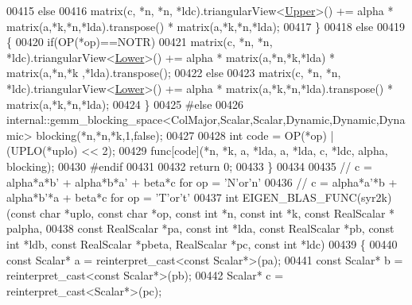 \begin{DoxyCode}
00415     \textcolor{keywordflow}{else}
00416       matrix(c, *n, *n, *ldc).triangularView<\hyperlink{group__enums_gga39e3366ff5554d731e7dc8bb642f83cda6bcb58be3b8b8ec84859ce0c5ac0aaec}{Upper}>() += alpha * matrix(a,*k,*n,*lda).transpose() * 
      matrix(a,*k,*n,*lda);
00417   \}
00418   \textcolor{keywordflow}{else}
00419   \{
00420     \textcolor{keywordflow}{if}(OP(*op)==NOTR)
00421       matrix(c, *n, *n, *ldc).triangularView<\hyperlink{group__enums_gga39e3366ff5554d731e7dc8bb642f83cda891792b8ed394f7607ab16dd716f60e6}{Lower}>() += alpha * matrix(a,*n,*k,*lda) * matrix(a,*n,*k
      ,*lda).transpose();
00422     \textcolor{keywordflow}{else}
00423       matrix(c, *n, *n, *ldc).triangularView<\hyperlink{group__enums_gga39e3366ff5554d731e7dc8bb642f83cda891792b8ed394f7607ab16dd716f60e6}{Lower}>() += alpha * matrix(a,*k,*n,*lda).transpose() * 
      matrix(a,*k,*n,*lda);
00424   \}
00425 \textcolor{preprocessor}{  #else}
00426   internal::gemm\_blocking\_space<ColMajor,Scalar,Scalar,Dynamic,Dynamic,Dynamic> blocking(*n,*n,*k,1,\textcolor{keyword}{false});
00427 
00428   \textcolor{keywordtype}{int} code = OP(*op) | (UPLO(*uplo) << 2);
00429   func[code](*n, *k, a, *lda, a, *lda, c, *ldc, alpha, blocking);
00430 \textcolor{preprocessor}{  #endif}
00431 
00432   \textcolor{keywordflow}{return} 0;
00433 \}
00434 
00435 \textcolor{comment}{// c = alpha*a*b' + alpha*b*a' + beta*c  for op = 'N'or'n'}
00436 \textcolor{comment}{// c = alpha*a'*b + alpha*b'*a + beta*c  for op = 'T'or't'}
00437 \textcolor{keywordtype}{int} EIGEN\_BLAS\_FUNC(syr2k)(\textcolor{keyword}{const} \textcolor{keywordtype}{char} *uplo, \textcolor{keyword}{const} \textcolor{keywordtype}{char} *op, \textcolor{keyword}{const} \textcolor{keywordtype}{int} *n, \textcolor{keyword}{const} \textcolor{keywordtype}{int} *k, \textcolor{keyword}{const} RealScalar *
      palpha,
00438                            \textcolor{keyword}{const} RealScalar *pa, \textcolor{keyword}{const} \textcolor{keywordtype}{int} *lda, \textcolor{keyword}{const} RealScalar *pb, \textcolor{keyword}{const} \textcolor{keywordtype}{int} *ldb, \textcolor{keyword}{
      const} RealScalar *pbeta, RealScalar *pc, \textcolor{keyword}{const} \textcolor{keywordtype}{int} *ldc)
00439 \{
00440   \textcolor{keyword}{const} Scalar* a = \textcolor{keyword}{reinterpret\_cast<}\textcolor{keyword}{const }Scalar*\textcolor{keyword}{>}(pa);
00441   \textcolor{keyword}{const} Scalar* b = \textcolor{keyword}{reinterpret\_cast<}\textcolor{keyword}{const }Scalar*\textcolor{keyword}{>}(pb);
00442   Scalar* c = \textcolor{keyword}{reinterpret\_cast<}Scalar*\textcolor{keyword}{>}(pc);

\end{DoxyCode}
